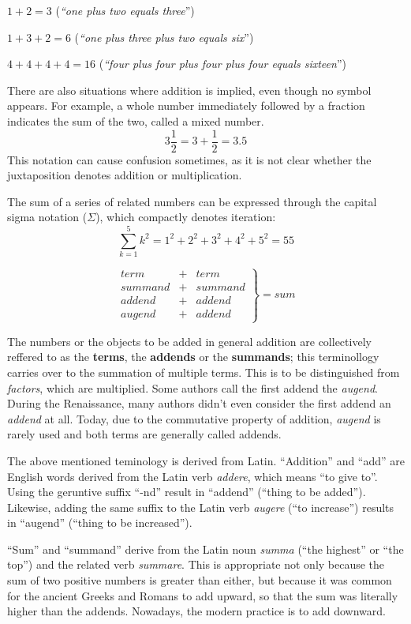 \documentclass[a4paper]{book}
\begin{document}
$1 + 2 = 3$ (\emph{``one plus two equals three}'')

$1 + 3 + 2 = 6$ (\emph{``one plus three plus two equals six}'')

$4 + 4 + 4 + 4 = 16$ (\emph{``four plus four plus four plus four equals sixteen}'')

There are also situations where addition is implied, even though no symbol appears. For example,
a whole number immediately followed by a fraction indicates the sum of the two, called a mixed number.
\[3\frac{1}{2} = 3 + \frac{1}{2} = 3.5\]
This notation can cause confusion sometimes, as it is not clear whether the juxtaposition denotes addition
or multiplication.

The sum of a series of related numbers can be expressed through the capital sigma notation ($\Sigma$),
which compactly denotes iteration:
\[\sum_{k=1}^{5}k^{2} = 1^{2} + 2^{2} + 3^{2} + 4^{2} + 5^{2} = 55\]

\[
    \left.
        \begin{array}{rcr}
        term & + & term \\
        summand & + & summand \\
        addend & + & addend \\
        augend & + & addend
        \end{array}
    \right\}
    = sum
\]

The numbers or the objects to be added in general addition are collectively reffered to as the \textbf{terms},
the \textbf{addends} or the \textbf{summands}; this terminollogy carries over to the summation of multiple terms.
This is to be distinguished from \textit{factors}, which are multiplied. Some authors call the first addend the
\textit{augend}. During the Renaissance, many authors didn't even consider the first addend an \textit{addend}
at all. Today, due to the commutative property of addition, \textit{augend} is rarely used and both terms are
generally called addends.

The above mentioned teminology is derived from Latin. ``Addition'' and ``add'' are English words derived from
the Latin verb \textit{addere}, which means ``to give to''. Using the geruntive suffix ``-nd'' result in
``addend'' (``thing to be added''). Likewise, adding the same suffix to the Latin verb \textit{augere}
(``to increase'') results in ``augend'' (``thing to be increased'').

``Sum'' and ``summand'' derive from the Latin noun \textit{summa} (``the highest'' or ``the top'') and the
related verb \textit{summare}. This is appropriate not only because the sum of two positive numbers is greater
than either, but because it was common for the ancient Greeks and Romans to add upward, so that the sum was
literally higher than the addends. Nowadays, the modern practice is to add downward.
\end{document}
